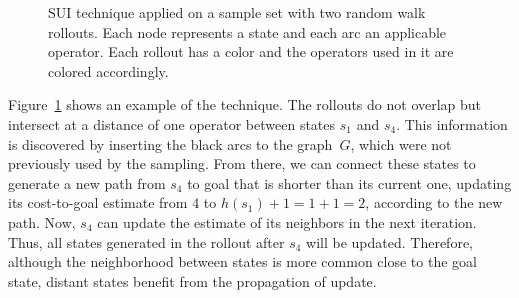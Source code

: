 \begin{figure}[h]
    \caption[SUI technique applied on a sample set with random walk rollouts.]{SUI technique applied on a sample set with two random walk rollouts. Each node represents a state and each arc an applicable operator. Each rollout has a color and the operators used in it are colored accordingly.}
    \label{fig:sui}
    \addvspace{\baselineskip}
    \centering
\end{figure}

Figure~\ref{fig:sui} shows an example of the technique. The rollouts do not overlap but intersect at a distance of one operator between states $s_1$ and $s_4$. This information is discovered by inserting the black arcs to the graph~$G$, which were not previously used by the sampling. From there, we can connect these states to generate a new path from $s_4$ to goal that is shorter than its current one, updating its cost-to-goal estimate from $4$ to $h(s_1)+1=1+1=2$, according to the new path. Now, $s_4$ can update the estimate of its neighbors in the next iteration. Thus, all states generated in the rollout after $s_4$ will be updated. Therefore, although the neighborhood between states is more common close to the goal state, distant states benefit from the propagation of update.

